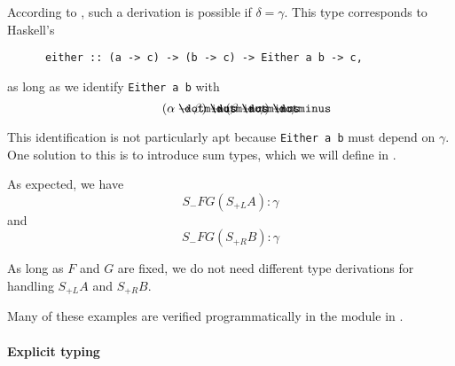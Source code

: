 \begin{example}
\begin{thmenum}
    According to , such a derivation is possible if \( \delta = \gamma \). This type corresponds to Haskell's
    \begin{verbatim}
      either :: (a -> c) -> (b -> c) -> Either a b -> c,
    \end{verbatim}\vspace{-\baselineskip}
    as long as we identify \verb|Either a b| with
    \begin{equation*}
      (\alpha \synimplies \beta) \synimplies (\beta \synimplies \gamma) \synimplies \gamma.
    \end{equation*}

    This identification is not particularly apt because \verb|Either a b| must depend on \( \gamma \). One solution to this is to introduce sum types, which we will define in .

    As expected, we have
    \begin{equation*}
      S_- F G (S_{+L} A): \gamma
    \end{equation*}
    and
    \begin{equation*}
      S_- F G (S_{+R} B): \gamma
    \end{equation*}

    As long as \( F \) and \( G \) are fixed, we do not need different type derivations for handling \( S_{+L} A \) and \( S_{+R} B \).
  \end{thmenum}
\end{example}
\begin{comments}
  \item Many of these examples are verified programmatically in the module  in \cite{notebook:code}.
\end{comments}

\paragraph{Explicit typing}

